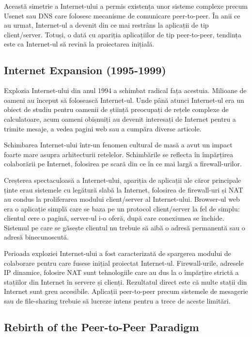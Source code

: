Această simetrie a Internet-ului a permis existența unor sisteme complexe
precum Usenet sau DNS care folosesc mecanisme de comunicare peer-to-peer. În
anii ce au urmat, Internet-ul a devenit din ce mai restrâns la aplicații de
tip client/server. Totuși, o dată cu apariția aplicațiilor de tip
peer-to-peer, tendința este ca Internet-ul să revină la proiectarea inițială.

\subsection{Internet Expansion (1995-1999)}

Explozia Internet-ului din anul 1994 a schimbat radical fața acestuia.
Milioane de oameni au început să folosească Internet-ul. Unde până atunci
Internet-ul era un obiect de studiu pentru oamenii de știință preocupați de
rețele complexe de calculatoare, acum oameni obișnuiți au devenit interesați
de Internet pentru a trimite mesaje, a vedea pagini web sau a cumpăra diverse
articole.

Schimbarea Internet-ului într-un fenomen cultural de masă a avut un impact
foarte mare asupra arhitecturii retelelor. Schimbările se reflecta în
împărțirea colaborării pe Internet, folosirea pe scară din ce în ce mai largă
a firewall-urilor.

Creșterea spectaculoasă a Internet-ului, apariția de aplicații ale căror
principale ținte erau sistemele cu legătură slabă la Internet, folosirea de
firewall-uri și NAT au condus la proliferarea modului client/server al
Internet-ului. Browser-ul web era o aplicație simplă care se baza pe un
protocol client/server la fel de simplu: clientul cere o pagină, server-ul i-o
oferă, după care conexiunea se închide. Sistemul pe care se găsește clientul
nu trebuie să aibă o adresă permanentă sau o adresă binecunoscută.

Perioada exploziei Internet-ului a fost caracterizată de spargerea modului de
colaborare pentru care fusese inițial proiectat Internet-ul. Firewall-urile,
adresele IP dinamice, folosire NAT sunt tehnologiile care au dus la o
împărțire strictă a stațiilor din Internet în servere și clienți. Rezultatul
direct este că multe stații din Internet sunt greu accesibile. Aplicații
peer-to-peer precum sistemele de mesagerie sau de file-sharing trebuie să
lucreze intens pentru a trece de aceste limitări.

\subsection{Rebirth of the Peer-to-Peer Paradigm}


